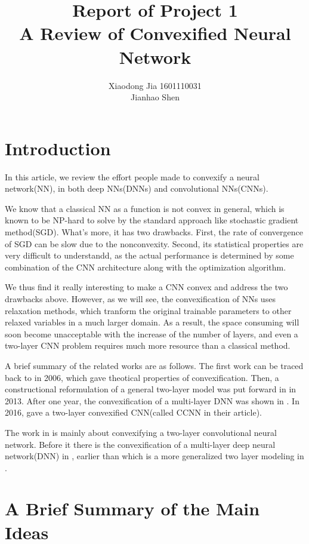 \documentclass{article}
\title{Report of Project 1\\A Review of Convexified Neural Network}
\author{Xiaodong Jia 1601110031\\Jianhao Shen}
\begin{document}
\maketitle

\tableofcontents
\newpage

\section{Introduction}
In this article, we review the effort people made to convexify a neural network(NN), in both deep NNs(DNNs) and convolutional NNs(CNNs).

We know that a classical NN as a function is not convex in general, which is known to be NP-hard to solve by the standard approach like stochastic gradient method(SGD). What's more, it has two drawbacks. First, the rate of convergence of SGD can be slow due to the nonconvexity. Second, its statistical properties are very difficult to understandd, as the actual performance is determined by some combination of the CNN architecture along with the optimization algorithm.

We thus find it really interesting to make a CNN convex and address the two drawbacks above. However, as we will see, the convexification of NNs uses relaxation methods, which tranform the original trainable parameters to other relaxed variables in a much larger domain. As a result, the space consuming will soon become unacceptable with the increase of the number of layers, and even a two-layer CNN problem requires much more resource than a classical method.

A brief summary of the related works are as follows. The first work can be traced back to \cite{bengio2006convex} in 2006, which gave theotical properties of convexification. Then,  a constructional reformulation of a general two-layer model was put forward in \cite{aslan2013convex} in 2013. After one year, the convexification of a multi-layer DNN was shown in \cite{aslan2014convex}. In 2016, \cite{zhang2016convexified} gave a two-layer convexified CNN(called CCNN in their article).

The work in \cite{zhang2016convexified} is mainly about convexifying a two-layer convolutional neural network. Before it there is the convexification of a multi-layer deep neural network(DNN) in \cite{aslan2014convex}, earlier than which is a more generalized two layer modeling in \cite{aslan2013convex}.

\section{A Brief Summary of the Main Ideas}
\end{document}
